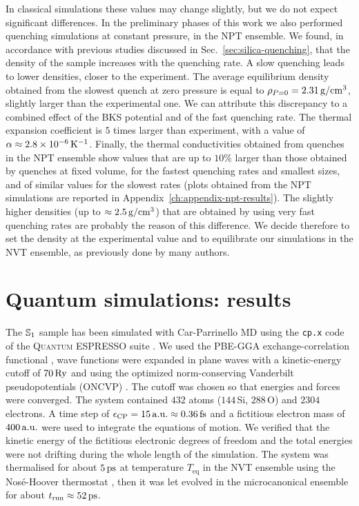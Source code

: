In classical simulations these values may change slightly, but we do not expect significant differences. 
In the preliminary phases of this work we also performed quenching simulations at constant pressure, in the NPT ensemble. 
We found, in accordance with previous studies discussed in Sec.~\ref{sec:silica-quenching}, that the density of the sample increases with the quenching rate. A slow quenching leads to lower densities, closer to the experiment. The average equilibrium density obtained from the slowest quench at zero pressure is equal to $\rho_{P=0}=2.31\,\mathrm{g/cm^3}$, slightly larger than the experimental one. We can attribute this discrepancy to a combined effect of the BKS potential and of the fast quenching rate. 
The thermal expansion coefficient is $5$ times larger than experiment, with a value of $\alpha\approx 2.8\times 10^{-6} \,\mathrm{K^{-1}}$. 
Finally, the thermal conductivities obtained from quenches in the NPT ensemble show values that are up to $10\%$ larger than those obtained by quenches at fixed volume, for the fastest quenching rates and smallest sizes, and of similar values for the slowest rates (plots obtained from the NPT simulations are reported in Appendix~\ref{ch:appendix-npt-results}). 
The slightly higher densities (up to $\approx 2.5\,\mathrm{g/cm^3}$) that are obtained by using very fast quenching rates are probably the reason of this difference. 
We decide therefore to set the density at the experimental value and to equilibrate our simulations in the NVT ensemble, as previously done by many authors.


\section{Quantum simulations: results}  \label{sec:results-quantum}
The $\S1$ sample has been simulated with Car-Parrinello MD using the \texttt{cp.x} code of the \textsc{Quantum ESPRESSO} suite \cite{Giannozzi2009,Giannozzi2017}. 
We used the PBE-GGA exchange-correlation functional \cite{Perdew1996}, wave functions were expanded in plane waves with a kinetic-energy cutoff of $70\,\mathrm{Ry}$ and using the optimized norm-conserving Vanderbilt pseudopotentials (ONCVP) \cite{Schlipf2015,Hamann2013}. The cutoff was chosen so that energies and forces were converged.
The system contained $432$ atoms ($144\,$Si, $288\,$O) and $2304$ electrons. A time step of $\epsilon_\textrm{CP} = 15\,\mathrm{a.u.} \approx 0.36\,\mathrm{fs}$ and a fictitious electron mass of $400\,\mathrm{a.u.}$ were used to integrate the equations of motion. 
We verified that the kinetic energy of the fictitious electronic degrees of freedom and the total energies were not drifting during the whole length of the simulation. 
The system was thermalised for about $5\,\mathrm{ps}$ at temperature $T_\mathrm{eq}$ in the NVT ensemble using the Nos\'e-Hoover thermostat \cite{Nose1984,Hoover1985}, then it was let evolved in the microcanonical ensemble for about $t_\mathrm{run}\approx 52\,\mathrm{ps}$. 

